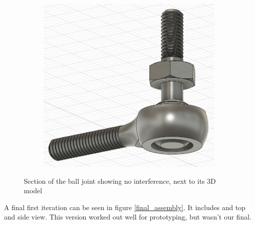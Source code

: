 \documentclass[a4paper, 10pt]{article}
\begin{document}
\begin{figure}[h]
\begin{subfigure}[h]{0.34\textwidth}
			\end{subfigure}
			\hfill
			\begin{subfigure}[h]{0.65\textwidth}
				\centering
				\includegraphics[width=\textwidth]{Photos/ball_joint}
			\end{subfigure}
			\centering
			\caption{Section of the ball joint showing no interference, next to its 3D model}
			\label{ball_joint}
		\end{figure}
		
		A final first iteration can be seen in figure \ref{final_assembly}. It includes and top and side view. This version worked out well for prototyping, but wasn't our final.
		
\end{document}
